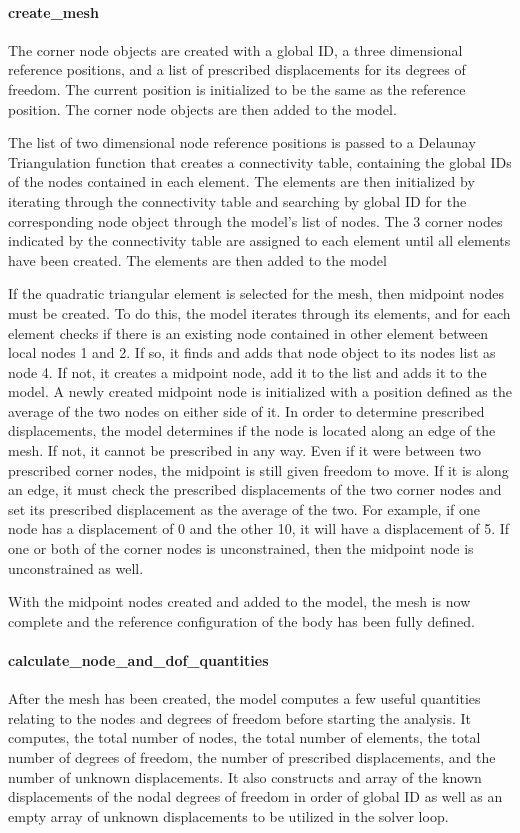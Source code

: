 \documentclass[]{spie}  %
\begin{document}
\paragraph{create\_mesh}
The corner node objects are created with a global ID, a three dimensional reference positions, and a list of prescribed displacements for its degrees of freedom. The current position is initialized to be the same as the reference position. The corner node objects are then added to the model. 

The list of two dimensional node reference positions is passed to a Delaunay Triangulation function that creates a connectivity table, containing the global IDs of the nodes contained in each element. The elements are then initialized by iterating through the connectivity table and searching by global ID for the corresponding node object through the model's list of nodes. The 3 corner nodes indicated by the connectivity table are assigned to each element until all elements have been created. The elements are then added to the model

If the quadratic triangular element is selected for the mesh, then midpoint nodes must be created. To do this, the model iterates through its elements, and for each element checks if there is an existing node contained in other element between local nodes 1 and 2. If so, it finds and adds that node object to its nodes list as node 4. If not, it creates a midpoint node, add it to the list and adds it to the model. A newly created midpoint node is initialized with a position defined as the average of the two nodes on either side of it. In order to determine prescribed displacements, the model determines if the node is located along an edge of the mesh. If not, it cannot be prescribed in any way. Even if it were between two prescribed corner nodes, the midpoint is still given freedom to move. If it is along an edge, it must check the prescribed displacements of the two corner nodes and set its prescribed displacement as the average of the two. For example, if one node has a displacement of 0 and the other 10, it will have a displacement of 5. If one or both of the corner nodes is unconstrained, then the midpoint node is unconstrained as well.

With the midpoint nodes created and added to the model, the mesh is now complete and the reference configuration of the body has been fully defined. 

\paragraph{calculate\_node\_and\_dof\_quantities}
After the mesh has been created, the model computes a few useful quantities relating to the nodes and degrees of freedom before starting the analysis. It computes, the total number of nodes, the total number of elements, the total number of degrees of freedom, the number of prescribed displacements, and the number of unknown displacements. It also constructs and array of the known displacements of the nodal degrees of freedom in order of global ID as well as an empty array of unknown displacements to be utilized in the solver loop. 
\end{document}
